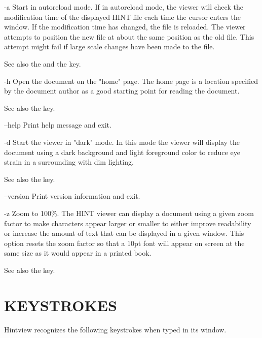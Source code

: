 \itemize
\item{-a}     Start in autoreload mode. If in autoreload mode, the viewer will
              check the modification time of the displayed HINT file each time
              the cursor enters the window.   If  the  modification  time  has
              changed,  the file is reloaded.  The viewer attempts to position
              the new file at about the same position as the  old  file.  This
              attempt  might fail if large scale changes have been made to the
              file.

              See also the  and the  key.

\item{-h}     Open the document on the "home" page. The home page is  a  location
              specified  by the document author as a good starting point
              for reading the document.

              See also the  key.

\item{--help} Print help message and exit.

\item{-d}     Start the viewer in "dark" mode. In this mode the  viewer  will
              display  the  document  using  a dark background and light foreground
              color to reduce eye strain  in  a  surrounding  with  dim
              lighting.

              See also the  key.

\item{--version}
              Print version information and exit.

\item{-z}     Zoom  to  100\%.  The  HINT viewer can display a document using a
              given zoom factor to make characters appear larger or smaller to
              either  improve  readability or increase the amount of text that
              can be displayed in a given window. This option resets the  zoom
              factor  so  that  a  10pt font will appear on screen at the same
              size as it would appear in a printed book.

              See also the  key.
              
\enditemize

\section{KEYSTROKES}
       Hintview recognizes the following keystrokes when typed in its window.

